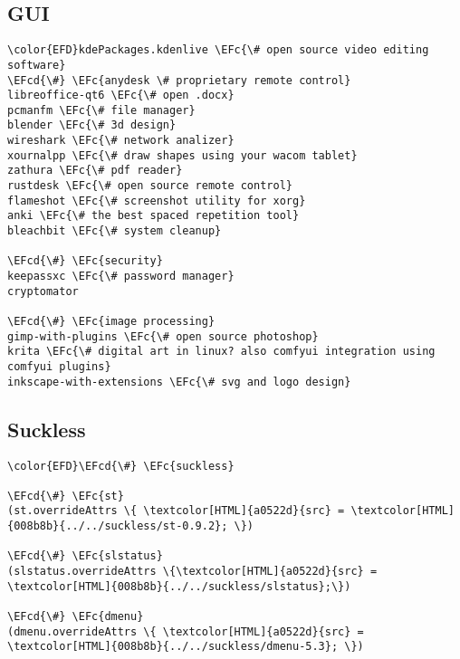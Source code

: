 \documentclass[14pt]{article}
\newcommand{\EFc}[1]{\textcolor{EFc}{#1}} %
\newcommand{\EFcd}[1]{\textcolor{EFcd}{#1}} %
\begin{document}
\subsection{GUI}
\label{sec:orgdcf04d2}
\begin{Code}
\begin{Verbatim}
\color{EFD}kdePackages.kdenlive \EFc{\# open source video editing software}
\EFcd{\#} \EFc{anydesk \# proprietary remote control}
libreoffice-qt6 \EFc{\# open .docx}
pcmanfm \EFc{\# file manager}
blender \EFc{\# 3d design}
wireshark \EFc{\# network analizer}
xournalpp \EFc{\# draw shapes using your wacom tablet}
zathura \EFc{\# pdf reader}
rustdesk \EFc{\# open source remote control}
flameshot \EFc{\# screenshot utility for xorg}
anki \EFc{\# the best spaced repetition tool}
bleachbit \EFc{\# system cleanup}

\EFcd{\#} \EFc{security}
keepassxc \EFc{\# password manager}
cryptomator

\EFcd{\#} \EFc{image processing}
gimp-with-plugins \EFc{\# open source photoshop}
krita \EFc{\# digital art in linux? also comfyui integration using comfyui plugins}
inkscape-with-extensions \EFc{\# svg and logo design}
\end{Verbatim}
\end{Code}
\subsection{Suckless}
\label{sec:org87b81e1}
\begin{Code}
\begin{Verbatim}
\color{EFD}\EFcd{\#} \EFc{suckless}

\EFcd{\#} \EFc{st}
(st.overrideAttrs \{ \textcolor[HTML]{a0522d}{src} = \textcolor[HTML]{008b8b}{../../suckless/st-0.9.2}; \})

\EFcd{\#} \EFc{slstatus}
(slstatus.overrideAttrs \{\textcolor[HTML]{a0522d}{src} = \textcolor[HTML]{008b8b}{../../suckless/slstatus};\})

\EFcd{\#} \EFc{dmenu}
(dmenu.overrideAttrs \{ \textcolor[HTML]{a0522d}{src} = \textcolor[HTML]{008b8b}{../../suckless/dmenu-5.3}; \})

\end{Verbatim}
\end{Code}
\end{document}
